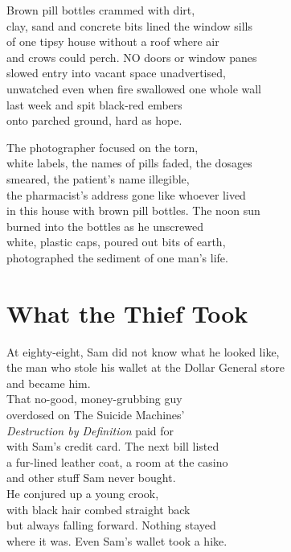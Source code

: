 \documentclass[twoside,10pt]{book}
\begin{document}
Brown pill bottles crammed with dirt,\\
clay, sand and concrete bits lined the window sills\\
of one tipsy house without a roof where air\\
and crows could perch. NO doors or window panes\\
slowed entry into vacant space unadvertised,\\
unwatched even when fire swallowed one whole wall\\
last week and spit black-red embers\\
onto parched ground, hard as hope.

The photographer focused on the torn,\\
white labels, the names of pills faded, the dosages\\
smeared, the patient's name illegible,\\
the pharmacist's address gone like whoever lived\\
in this house with brown pill bottles. The noon sun\\
burned into the bottles as he unscrewed\\
white, plastic caps, poured out bits of earth,\\
photographed the sediment of one man's life.


\clearpage
\section{What the Thief Took}

At eighty-eight, Sam did not know what he looked like,\\
the man who stole his wallet at the Dollar General store\\
and became him.\\
That no-good, money-grubbing guy\\
overdosed on The Suicide Machines'\\
\emph{Destruction by Definition} paid for\\
with Sam's credit card. The next bill listed\\
a fur-lined leather coat, a room at the casino\\
and other stuff Sam never bought.\\
He conjured up a young crook,\\
with black hair combed straight back\\
but always falling forward. Nothing stayed\\
where it was. Even Sam's wallet took a hike.
\end{document}
